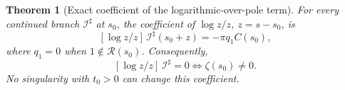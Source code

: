 \documentclass[11pt]{amsart}
\numberwithin{equation}{section}
\theoremstyle{plain}
\newtheorem{theorem}{Theorem}[section]
\theoremstyle{definition}
\theoremstyle{remark}
\begin{document}
\begin{theorem}[Exact coefficient of the logarithmic-over-pole term]
\label{thm:principal_replica_filter}
For every continued branch \(\mathcal I^\sharp\) at \(s_0\), the coefficient
of \(\log z/z\), \(z=s-s_0\), is
\begin{equation}
\boxed{
[\log z/z]\,\mathcal I^\sharp(s_0+z)
=-\pi q_1 C(s_0),}
\label{eq:general_log_over_pole_coefficient}
\end{equation}
where \(q_1=0\) when \(1\notin\mathcal R(s_0)\).  Consequently,
\begin{equation}
\boxed{
[\log z/z]\,\mathcal I^\sharp=0
\iff
\zeta(s_0)\ne0.}
\label{eq:true_zero_detector_I}
\end{equation}
No singularity with \(t_0>0\) can change this coefficient.
\end{theorem}
\end{document}
